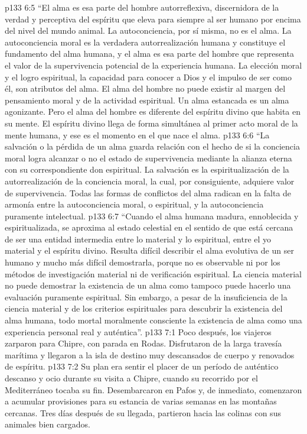 \vs p133 6:5 \pc “El alma es esa parte del hombre autorreflexiva, discernidora de la verdad y perceptiva del espíritu que eleva para siempre al ser humano por encima del nivel del mundo animal. La autoconciencia, por sí misma, no es el alma. La autoconciencia moral es la verdadera autorrealización humana y constituye el fundamento del alma humana, y el alma es esa parte del hombre que representa el valor de la supervivencia potencial de la experiencia humana. La elección moral y el logro espiritual, la capacidad para conocer a Dios y el impulso de ser como él, son atributos del alma. El alma del hombre no puede existir al margen del pensamiento moral y de la actividad espiritual. Un alma estancada es un alma agonizante. Pero el alma del hombre es diferente del espíritu divino que habita en su mente. El espíritu divino llega de forma simultánea al primer acto moral de la mente humana, y ese es el momento en el que nace el alma.
\vs p133 6:6 “La salvación o la pérdida de un alma guarda relación con el hecho de si la conciencia moral logra alcanzar o no el estado de supervivencia mediante la alianza eterna con su correspondiente don espiritual. La salvación es la espiritualización de la autorrealización de la conciencia moral, la cual, por consiguiente, adquiere valor de supervivencia. Todas las formas de conflictos del alma radican en la falta de armonía entre la autoconciencia moral, o espiritual, y la autoconciencia puramente intelectual.
\vs p133 6:7 “Cuando el alma humana madura, ennoblecida y espiritualizada, se aproxima al estado celestial en el sentido de que está cercana de ser una entidad intermedia entre lo material y lo espiritual, entre el yo material y el espíritu divino. Resulta difícil describir el alma evolutiva de un ser humano y mucho más difícil demostrarla, porque no es observable ni por los métodos de investigación material ni de verificación espiritual. La ciencia material no puede demostrar la existencia de un alma como tampoco puede hacerlo una evaluación puramente espiritual. Sin embargo, a pesar de la insuficiencia de la ciencia material y de los criterios espirituales para descubrir la existencia del alma humana, todo mortal moralmente consciente  la existencia de  alma como una experiencia personal real y auténtica”.
\vs p133 7:1 Poco después, los viajeros zarparon para Chipre, con parada en Rodas. Disfrutaron de la larga travesía marítima y llegaron a la isla de destino muy descansados de cuerpo y renovados de espíritu.
\vs p133 7:2 Su plan era sentir el placer de un período de auténtico descanso y ocio durante su visita a Chipre, cuando su recorrido por el Mediterráneo tocaba su fin. Desembarcaron en Pafos y, de inmediato, comenzaron a acumular provisiones para su estancia de varias semanas en las montañas cercanas. Tres días después de su llegada, partieron hacia las colinas con sus animales bien cargados.
